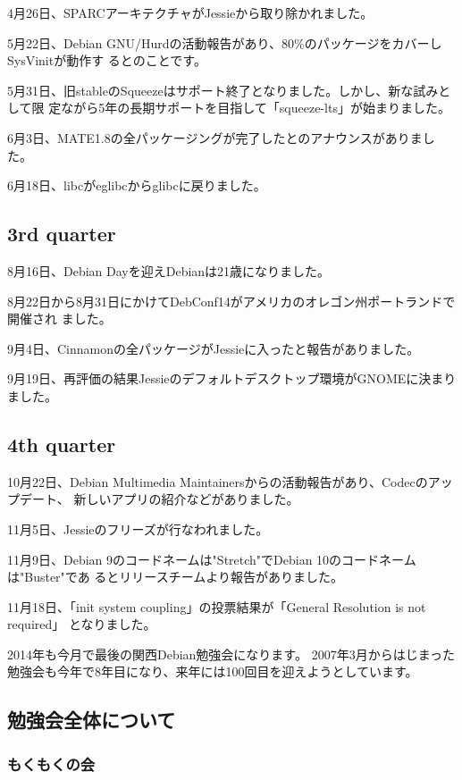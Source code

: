 \documentclass[mingoth,a4paper]{jsarticle}
\begin{document}
4月26日、SPARCアーキテクチャがJessieから取り除かれました。

5月22日、Debian GNU/Hurdの活動報告があり、80\%のパッケージをカバーしSysVinitが動作す
るとのことです。

5月31日、旧stableのSqueezeはサポート終了となりました。しかし、新な試みとして限
定ながら5年の長期サポートを目指して「squeeze-lts」が始まりました。

6月3日、MATE1.8の全パッケージングが完了したとのアナウンスがありました。

6月18日、libcがeglibcからglibcに戻りました。

\subsection{3rd quarter}

8月16日、Debian Dayを迎えDebianは21歳になりました。

8月22日から8月31日にかけてDebConf14がアメリカのオレゴン州ポートランドで開催され
ました。

9月4日、Cinnamonの全パッケージがJessieに入ったと報告がありました。

9月19日、再評価の結果Jessieのデフォルトデスクトップ環境がGNOMEに決まりました。

\subsection{4th quarter}

10月22日、Debian Multimedia Maintainersからの活動報告があり、Codecのアップデート、
新しいアプリの紹介などがありました。

11月5日、Jessieのフリーズが行なわれました。

11月9日、Debian 9のコードネームは"Stretch"でDebian 10のコードネームは"Buster"であ
るとリリースチームより報告がありました。

11月18日、「init system coupling」の投票結果が「General Resolution is not required」
となりました。


2014年も今月で最後の関西Debian勉強会になります。
2007年3月からはじまった勉強会も今年で8年目になり、来年には100回目を迎えようとしています。

\subsection{勉強会全体について}

\subsubsection{もくもくの会}
\end{document}
